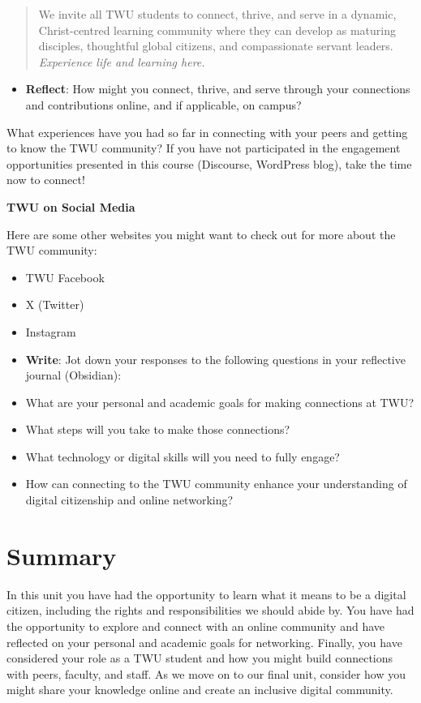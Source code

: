 \documentclass[
  letterpaper,
  DIV=11,
  numbers=noendperiod]{scrreprt}
\providecommand{\tightlist}{%
  \setlength{\itemsep}{0pt}\setlength{\parskip}{0pt}}\usepackage{longtable,booktabs,array}
\begin{document}
\begin{tcolorbox}
\begin{quote}
We invite all TWU students to connect, thrive, and serve in a dynamic,
Christ-centred learning community where they can develop as maturing
disciples, thoughtful global citizens, and compassionate servant
leaders. \emph{Experience life and learning here.}
\end{quote}

\begin{itemize}
\tightlist
\item
  \textbf{Reflect}: How might you connect, thrive, and serve through
  your connections and contributions online, and if applicable, on
  campus?
\end{itemize}

What experiences have you had so far in connecting with your peers and
getting to know the TWU community? If you have not participated in the
engagement opportunities presented in this course (Discourse, WordPress
blog), take the time now to connect!

\textbf{TWU on Social Media}

Here are some other websites you might want to check out for more about
the TWU community:

\begin{itemize}
\tightlist
\item
  TWU Facebook
\item
  X (Twitter)
\item
  Instagram
\item
  \textbf{Write}: Jot down your responses to the following questions in
  your reflective journal (Obsidian):
\item
  What are your personal and academic goals for making connections at
  TWU?
\item
  What steps will you take to make those connections?
\item
  What technology or digital skills will you need to fully engage?
\item
  How can connecting to the TWU community enhance your understanding of
  digital citizenship and online networking?
\end{itemize}

\end{tcolorbox}

\section{Summary}\label{summary-4}

In this unit you have had the opportunity to learn what it means to be a
digital citizen, including the rights and responsibilities we should
abide by. You have had the opportunity to explore and connect with an
online community and have reflected on your personal and academic goals
for networking. Finally, you have considered your role as a TWU student
and how you might build connections with peers, faculty, and staff. As
we move on to our final unit, consider how you might share your
knowledge online and create an inclusive digital community.
\end{document}
